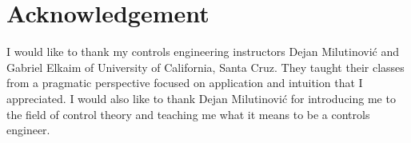 \documentclass[10pt,conference,compsoc]{IEEEtran}
\begin{document}
\section*{Acknowledgement}

I would like to thank my controls engineering instructors Dejan Milutinovi\'c
and Gabriel Elkaim of University of California, Santa Cruz. They taught their
classes from a pragmatic perspective focused on application and intuition that I
appreciated. I would also like to thank Dejan Milutinovi\'c for introducing me
to the field of control theory and teaching me what it means to be a controls
engineer.



\glsaddall
\printglossaries
\end{document}
